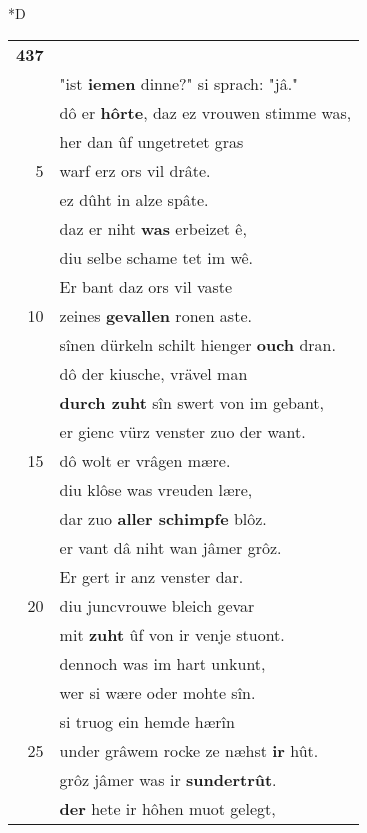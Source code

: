 \documentclass[8pt,a4paper,notitlepage]{article}
\begin{document}
\begin{table}[ht]
\begin{minipage}[t]{0.5\linewidth}
\small
\begin{center}*D
\end{center}
\begin{tabular}{rl}
\textbf{437} & \textit{\begin{large}E\end{large}}r \textbf{vrâgte} der gegenrede \textbf{aldâ}:\\ 
 & "ist \textbf{iemen} dinne?" si sprach: "jâ."\\ 
 & dô er \textbf{hôrte}, daz ez vrouwen stimme was,\\ 
 & her dan ûf ungetretet gras\\ 
5 & warf erz ors vil drâte.\\ 
 & ez dûht in alze spâte.\\ 
 & daz er niht \textbf{was} erbeizet ê,\\ 
 & diu selbe schame tet im wê.\\ 
 & Er bant daz ors vil vaste\\ 
10 & zeines \textbf{gevallen} ronen aste.\\ 
 & sînen dürkeln schilt hienger \textbf{ouch} dran.\\ 
 & dô der kiusche, vrävel man\\ 
 & \textbf{durch zuht} sîn swert von im gebant,\\ 
 & er gienc vürz venster zuo der want.\\ 
15 & dô wolt er vrâgen mære.\\ 
 & diu klôse was vreuden lære,\\ 
 & dar zuo \textbf{aller schimpfe} blôz.\\ 
 & er vant dâ niht wan jâmer grôz.\\ 
 & Er gert ir anz venster dar.\\ 
20 & diu juncvrouwe bleich gevar\\ 
 & mit \textbf{zuht} ûf von ir venje stuont.\\ 
 & dennoch was im hart unkunt,\\ 
 & wer si wære oder mohte sîn.\\ 
 & si truog ein hemde hærîn\\ 
25 & under grâwem rocke ze næhst \textbf{ir} hût.\\ 
 & grôz jâmer was ir \textbf{sundertrût}.\\ 
 & \textbf{der} hete ir hôhen muot gelegt,\\ 

\end{tabular}
\end{minipage}
\end{table}
\end{document}
